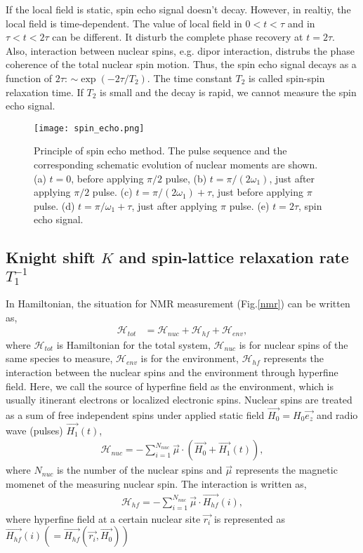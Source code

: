 If the local field is static, spin echo signal doesn't decay.
However, in realtiy, the local field is time-dependent.
The value of local field in $0 < t < \tau$ and in $\tau < t < 2\tau$ can be different.
It disturb the complete phase recovery at $t = 2\tau$.
Also, interaction between nuclear spins, e.g. dipor interaction, distrubs the phase coherence of the total nuclear spin motion.
Thus, the spin echo signal decays as a function of $2\tau$: $\sim \exp(-2\tau/T_2)$.
The time constant $T_2$ is called spin-spin relaxation time.
If $T_2$ is small and the decay is rapid, we cannot measure the spin echo signal.

\begin{figure}
  \centering
  \texttt{[image: spin\_echo.png]}
  \caption{Principle of spin echo method.
  The pulse sequence and the corresponding schematic evolution of nuclear moments are shown.
  (a) $t = 0$, before applying $\pi/2$ pulse, (b) $t = \pi/(2\omega_1)$, just after applying $\pi/2$ pulse.
  (c) $t = \pi/(2\omega_1) + \tau$, just before applying $\pi$ pulse.
  (d) $t = \pi/\omega_1 + \tau$, just after applying $\pi$ pulse.
  (e) $t = 2\tau$, spin echo signal.}
  \label{spin_echo}
\end{figure}

\subsection{Knight shift $K$ and spin-lattice relaxation rate $T^{-1}_1$}
In Hamiltonian, the situation for NMR measurement (Fig.\ref{nmr}) can be written as,
\begin{align}
\mathcal{H}_{tot} &=\mathcal{H}_{nuc} + \mathcal{H}_{hf}+\mathcal{H}_{env},
\end{align}
where $\mathcal{H}_{tot}$ is Hamiltonian for the total system,
$\mathcal{H}_{nuc}$ is for nuclear spins of the same species to measure, $\mathcal{H}_{env}$ is for the environment,
$\mathcal{H}_{hf}$ represents the interaction between the nuclear spins and the environment through hyperfine field.
Here, we call the source of hyperfine field as the environment, which is usually itinerant electrons or localized electronic spins.
Nuclear spins are treated as a sum of free independent spins under applied static field $\overrightarrow{H_0} = H_0\overrightarrow{e_z}$
and radio wave (pulses) $\overrightarrow{H_1}(t)$,
\begin{align}
\mathcal{H}_{nuc} = -\sum^{N_{nuc}}_{i = 1}\vec{\mu}\cdot\left(\overrightarrow{H_0}+\overrightarrow{H_1}(t)\right),
\end{align}
where $N_{nuc}$ is the number of the nuclear spins and $\vec{\mu}$ represents the magnetic momenet of the measuring nuclear spin.
The interaction is written as,
\begin{align}
\mathcal{H}_{hf} = -\sum^{N_{nuc}}_{i = 1}\vec{\mu}\cdot\overrightarrow{H_{hf}}(i),
\end{align}
where hyperfine field at a certain nuclear site $\overrightarrow{r_i}$ is represented as
$\overrightarrow{H_{hf}}(i) \left(= \overrightarrow{H_{hf}}\left(\overrightarrow{r_i}, \overrightarrow{H_0}\right) \right)$

